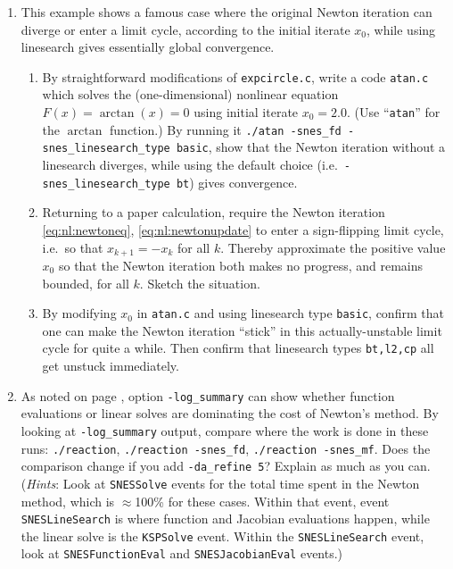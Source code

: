 \begin{enumerate}
\item  \label{exer:nl:newtonatan}
This example shows a famous case where the original Newton iteration can diverge or enter a limit cycle, according to the initial iterate $x_0$, while using linesearch gives essentially global convergence.
    \begin{enumerate}
    \item By straightforward modifications of \texttt{expcircle.c}, write a code \texttt{atan.c} which solves the (one-dimensional) nonlinear equation $F(x)=\arctan(x)=0$ using initial iterate $x_0=2.0$.  (Use ``\texttt{atan}'' for the $\arctan$ function.)  By running it \texttt{./atan -snes\_fd -snes\_linesearch\_type basic}, show that the Newton iteration without a linesearch diverges, while using the default choice (i.e.~\texttt{-snes\_linesearch\_type bt}) gives convergence.
    \item Returning to a paper calculation, require the Newton iteration \eqref{eq:nl:newtoneq}, \eqref{eq:nl:newtonupdate} to enter a sign-flipping limit cycle, i.e.~so that $x_{k+1} = - x_k$ for all $k$.  Thereby approximate the positive value $x_0$ so that the Newton iteration both makes no progress, and remains bounded, for all $k$.  Sketch the situation.
    \item By modifying $x_0$ in \texttt{atan.c} and using linesearch type \texttt{basic}, confirm that one can make the Newton iteration ``stick'' in this actually-unstable limit cycle for quite a while.  Then confirm that linesearch types \texttt{bt,l2,cp} all get unstuck immediately.
    \end{enumerate}

\item As noted on page \pageref{sidenote:logsummary}, \PETSc option \texttt{-log\_summary} can show whether function evaluations or linear solves are dominating the cost of Newton's method.  By looking at \texttt{-log\_summary} output, compare where the work is done in these runs: \texttt{./reaction}, \texttt{./reaction -snes\_fd}, \texttt{./reaction -snes\_mf}.  Does the comparison change if you add \texttt{-da\_refine 5}?  Explain as much as you can.  (\emph{Hints}: Look at \texttt{SNESSolve} events for the total time spent in the Newton method, which is $\approx$100\% for these cases.  Within that event, event \texttt{SNESLineSearch} is where function and Jacobian evaluations happen, while the linear solve is the \texttt{KSPSolve} event.  Within the \texttt{SNESLineSearch} event, look at \texttt{SNESFunctionEval} and \texttt{SNESJacobianEval} events.)


\end{enumerate}
